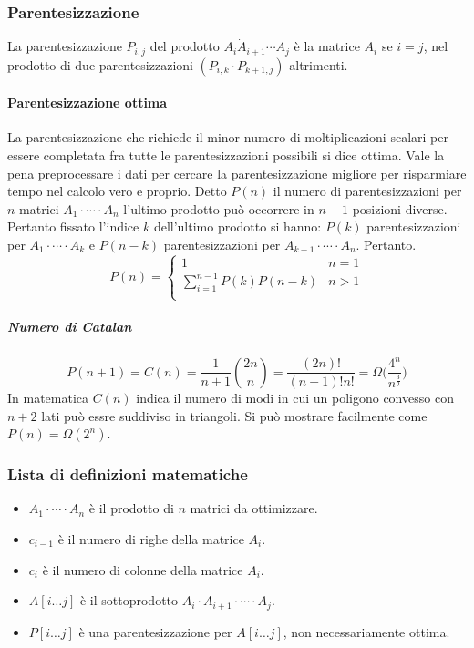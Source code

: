 \subsubsection{Parentesizzazione}
La parentesizzazione $P_{i, j}$ del prodotto $A_i\dot A_{i+1}\cdots A_j$ \`e la matrice $A_i$ se $i=j$, nel prodotto di due parentesizzazioni $(P_{i,k}
\cdot P_{k+1, j})$ altrimenti. 
\paragraph{Parentesizzazione ottima}
La parentesizzazione che richiede il minor numero di moltiplicazioni scalari per essere completata fra tutte le parentesizzazioni possibili si dice 
ottima. Vale la pena preprocessare i dati per cercare la parentesizzazione migliore per risparmiare tempo nel calcolo vero e proprio. Detto $P(n)$ il
numero di parentesizzazioni per $n$ matrici $A_1\cdot\cdots\cdot A_n$ l'ultimo prodotto pu\`o occorrere in $n-1$ posizioni diverse. Pertanto fissato 
l'indice $k$ dell'ultimo prodotto si hanno: $P(k)$ parentesizzazioni per $A_1\cdot\cdots\cdot A_k$ e $P(n-k)$ parentesizzazioni per  $A_{k+1}\cdot\cdots
\cdot A_n$. Pertanto.
$$P(n) = 
\begin{cases}
	1 & n =1 \\
	\sum\limits_{i = 1}^{n-1} P(k)P(n-k) & n > 1\\
\end{cases}$$
\subparagraph{Numero di Catalan}
$$P(n+1) = C(n) = \dfrac{1}{n+1}\binom{2n}{n} = \dfrac{(2n)!}{(n+1)!n!} = \Omega\biggl(\dfrac{4^n}{n^{\frac{3}{2}}}\biggr)$$
In matematica $C(n)$ indica il numero di modi in cui un poligono convesso con $n+2$ lati pu\`o essre suddiviso in triangoli. Si pu\`o mostrare facilmente
come $P(n)=\Omega(2^n)$. 
\subsubsection{Lista di definizioni matematiche}
\begin{itemize}
	\item $A_1\cdot\cdots\cdot A_n$ \`e il prodotto di $n$ matrici da ottimizzare.
	\item $c_{i-1}$ \`e il numero di righe della matrice $A_i$.
	\item $c_i$ \`e il numero di colonne della matrice $A_i$.
	\item $A[i\dots j]$ \`e il sottoprodotto $A_i\cdot A_{i+1}\cdot\cdots\cdot A_j$.
	\item $P[i\dots j]$ \`e una parentesizzazione per $A[i\dots j]$, non necessariamente ottima. 
\end{itemize}
